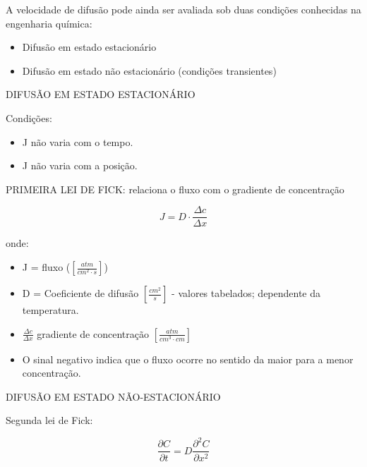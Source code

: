 A velocidade de difusão pode ainda ser avaliada sob duas condições conhecidas na engenharia química:

\begin{itemize}
\item Difusão em estado estacionário
\item Difusão em estado não estacionário (condições transientes)
\end{itemize}

DIFUSÃO EM ESTADO ESTACIONÁRIO

Condições:

\begin{itemize}
	\item J não varia com o tempo.
	\item J não varia com a posição.
\end{itemize}

PRIMEIRA LEI DE FICK: relaciona o fluxo com o gradiente de concentração

\begin{equation}\label{key}
J = D \cdot \frac{\Delta c}{\Delta x}
\end{equation}

onde: 

\begin{itemize}
	\item J = fluxo ($[\frac{atm}{cm^{2}\cdot s}]$)
	\item D = Coeficiente de difusão $[\frac{cm^{2}}{s}]$ - valores tabelados; dependente da temperatura.
	\item $\frac{\Delta c}{\Delta x}$ gradiente de concentração $[\frac{atm}{cm^{3} \cdot cm}]$
	\item O sinal negativo indica que o fluxo ocorre no sentido da maior para a menor concentração.
\end{itemize}

DIFUSÃO EM ESTADO NÃO-ESTACIONÁRIO

Segunda lei de Fick:

\begin{equation}\label{key}
\frac{\partial C}{\partial t}=D \frac{\partial^{2} C}{\partial x^{2}}
\end{equation}



